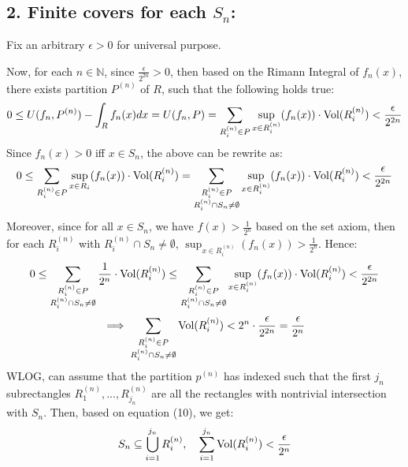 \documentclass{article}
\begin{document}
\subsection*{2. Finite covers for each $S_n$:}
Fix an arbitrary $\epsilon>0$ for universal purpose. 

Now, for each $n\in\mathbb{N}$, since $\frac{\epsilon}{2^{2n}}>0$, then based on the Rimann Integral of $f_n(x)$, there exists partition $P^{(n)}$ of $R$, such that the following holds true:
\begin{equation}
    0\leq U(f_n,P^{(n)})-\int_{R}f_n(x)dx = U(f_n,P) = \sum_{R_i^{(n)}\in P}\sup_{x\in R_i^{(n)}}(f_n(x))\cdot \textmd{Vol}(R_i^{(n)}) < \frac{\epsilon}{2^{2n}}
\end{equation}
Since $f_n(x)>0$ iff $x\in S_n$, the above can be rewrite as:
$$0\leq \sum_{R_i^{(n)}\in P}\sup_{x\in R_i}(f_n(x))\cdot \textmd{Vol}(R_i^{(n)}) = \sum_{\substack{R_i^{(n)}\in P\\R_i^{(n)}\cap S_n\neq \emptyset}}\sup_{x\in R_i^{(n)}}(f_n(x))\cdot \textmd{Vol}(R_i^{(n)})<\frac{\epsilon}{2^{2n}}$$
Moreover, since for all $x\in S_n$, we have $f(x)>\frac{1}{2^n}$ based on the set axiom, then for each $R_i^{(n)}$ with $R_i^{(n)}\cap S_n\neq\emptyset$, $\sup_{x\in R_i^{(n)}}(f_n(x))>\frac{1}{2^n}$. Hence:
\begin{equation}
    0\leq \sum_{\substack{R_i^{(n)}\in P\\R_i^{(n)}\cap S_n\neq \emptyset}}\frac{1}{2^n}\cdot \textmd{Vol}(R_i^{(n)})\leq \sum_{\substack{R_i^{(n)}\in P\\R_i^{(n)}\cap S_n\neq \emptyset}}\sup_{x\in R_i^{(n)}}(f_n(x))\cdot \textmd{Vol}(R_i^{(n)}) < \frac{\epsilon}{2^{2n}}
\end{equation}
\begin{equation}
    \implies \sum_{\substack{R_i^{(n)}\in P\\R_i^{(n)}\cap S_n\neq \emptyset}}\textmd{Vol}(R_i^{(n)})<2^n\cdot \frac{\epsilon}{2^{2n}} = \frac{\epsilon}{2^n}
\end{equation}
WLOG, can assume that the partition $p^{(n)}$ has indexed such that the first $j_n$ subrectangles $R_1^{(n)},...,R_{j_n}^{(n)}$ are all the rectangles with nontrivial intersection with $S_n$. Then, based on equation (10), we get:
\begin{equation}
    S_n\subseteq\bigcup_{i=1}^{j_n}R_i^{(n)},\quad \sum_{i=1}^{j_n}\textmd{Vol}(R_i^{(n)}) < \frac{\epsilon}{2^n}
\end{equation}
\end{document}
